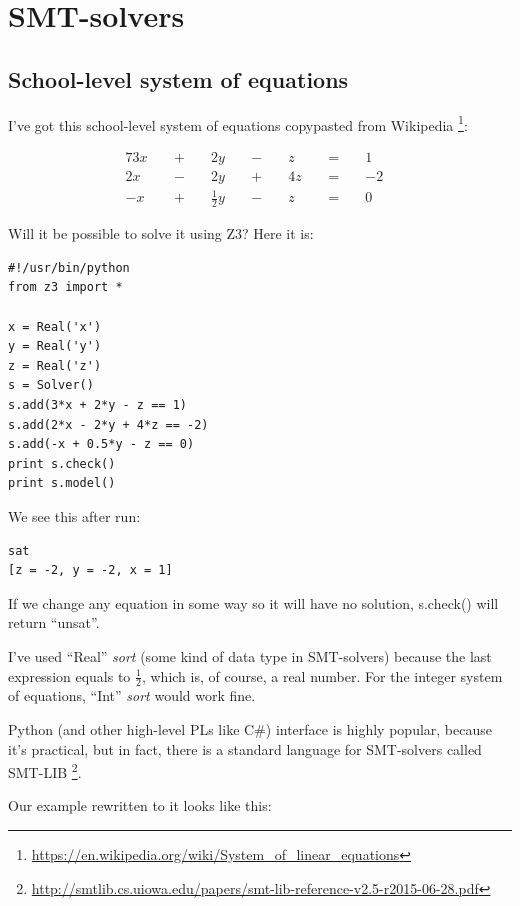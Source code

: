 \section{\ac{SMT}-solvers}

\subsection{School-level system of equations}

I've got this school-level system of equations copypasted from Wikipedia
\footnote{\url{https://en.wikipedia.org/wiki/System_of_linear_equations}}:

\begin{alignat*}{7}
3x &&\; + \;&& 2y             &&\; - \;&& z  &&\; = \;&& 1 & \\
2x &&\; - \;&& 2y             &&\; + \;&& 4z &&\; = \;&& -2 & \\
-x &&\; + \;&& \tfrac{1}{2} y &&\; - \;&& z  &&\; = \;&& 0 &
\end{alignat*}

Will it be possible to solve it using Z3? Here it is:

\begin{lstlisting}
#!/usr/bin/python
from z3 import *

x = Real('x')
y = Real('y')
z = Real('z')
s = Solver()
s.add(3*x + 2*y - z == 1)
s.add(2*x - 2*y + 4*z == -2)
s.add(-x + 0.5*y - z == 0)
print s.check()
print s.model()
\end{lstlisting}

We see this after run:

\begin{lstlisting}
sat
[z = -2, y = -2, x = 1]
\end{lstlisting}

If we change any equation in some way so it will have no solution, s.check() will return ``unsat''.

I've used ``Real'' \textit{sort} (some kind of data type in \ac{SMT}-solvers)
because the last expression equals to $\frac{1}{2}$, which is, of course, a real number.
For the integer system of equations, ``Int'' \textit{sort} would work fine.

Python (and other high-level \ac{PL}s like C\#) interface is highly popular, because it's practical, but in fact, 
there is a standard language for \ac{SMT}-solvers called SMT-LIB
\footnote{\url{http://smtlib.cs.uiowa.edu/papers/smt-lib-reference-v2.5-r2015-06-28.pdf}}.

Our example rewritten to it looks like this:


